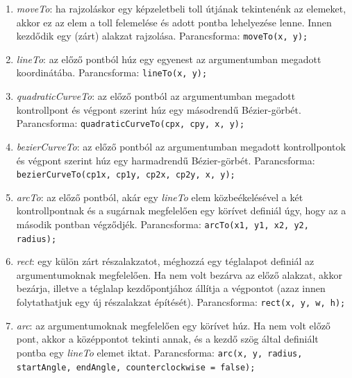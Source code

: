 \documentclass[12pt]{report}
\theoremstyle{definition}
\begin{document}
\begin{enumerate}[I.]
\begin{enumerate}
      \item \emph{moveTo}: ha rajzoláskor egy képzeletbeli toll
      útjának tekintenénk az elemeket, akkor ez az elem a toll
      felemelése és adott pontba lehelyezése lenne. Innen kezdődik
      egy (zárt) alakzat rajzolása. Parancsforma:\newline
        \texttt{moveTo(x, y);}
      \item \emph{lineTo}: az előző pontból húz egy egyenest az
      argumentumban megadott koordinátába. Parancsforma:\newline
        \texttt{lineTo(x, y);}
      \item \emph{quadraticCurveTo}: az előző pontból az
      argumentumban megadott kontrollpont és végpont szerint húz
      egy másodrendű Bézier-görbét. Parancsforma:\newline
        \texttt{quadraticCurveTo(cpx, cpy, x, y);}
      \item \emph{bezierCurveTo}: az előző pontból az
      argumentumban megadott kontrollpontok és végpont szerint húz
      egy harmadrendű Bézier-görbét. Parancsforma:\newline
        \texttt{bezierCurveTo(cp1x, cp1y, cp2x, cp2y, x, y);}
      \item \emph{arcTo}: az előző pontból, akár egy
      \emph{lineTo} elem közbeékelésével a két kontrollpontnak
      és a sugárnak megfelelően egy körívet definiál úgy,
      hogy az a második pontban végződjék. Parancsforma:\newline
        \texttt{arcTo(x1, y1, x2, y2, radius);}
      \item \emph{rect}: egy külön zárt részalakzatot,
      méghozzá egy téglalapot definiál az argumentumoknak
      megfelelően. Ha nem volt bezárva az előző alakzat, akkor
      bezárja, illetve a téglalap kezdőpontjához állítja a
      végpontot (azaz innen folytathatjuk egy új részalakzat
      építését). Parancsforma:\newline
        \texttt{rect(x, y, w, h);}
      \item \emph{arc}: az argumentumoknak megfelelően egy
      körívet húz. Ha nem volt előző pont, akkor a
      középpontot tekinti annak, és a kezdő szög által
      definiált pontba egy \emph{lineTo} elemet iktat.
      Parancsforma:\newline
        \texttt{arc(x, y, radius, startAngle, endAngle, counterclockwise = false);}
    \end{enumerate}
\end{enumerate}
\end{document}
